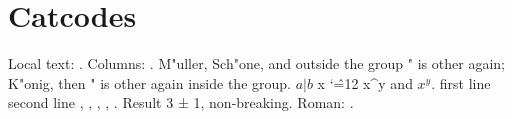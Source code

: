 \section{Catcodes}
\makeatletter Local text: \gm@localtext. \makeatother
Columns: \gmcolumncase{\gm@one}{\gm@two}.
{\gmdqon M"uller, Sch"one}, and outside the group " is other again;
{\gmdqon K"onig\gmdqoff, then " is other again inside the group}.
{\gmbaron $a|b$}
\gmlbrace x\gmrbrace
{\catcode`\^=12 x^y} and $x^y$.
{\obeylines first line
second line}
\gmunderscore, \gmjoined, , , .
Result 3 ± 1, non‑breaking.
Roman: .

